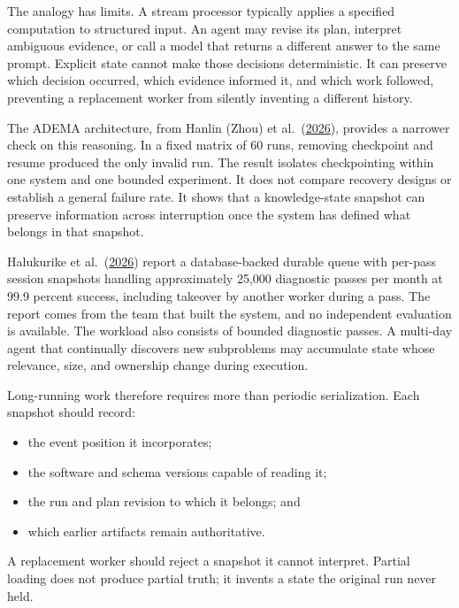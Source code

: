 The analogy has limits. A stream processor typically applies a specified computation to structured input. An agent may revise its plan, interpret ambiguous evidence, or call a model that returns a different answer to the same prompt. Explicit state cannot make those decisions deterministic. It can preserve which decision occurred, which evidence informed it, and which work followed, preventing a replacement worker from silently inventing a different history.

The ADEMA architecture, from Hanlin (Zhou) et al.~(\href{https://arxiv.org/abs/2604.25849}{2026}), provides a narrower check on this reasoning. In a fixed matrix of 60 runs, removing checkpoint and resume produced the only invalid run. The result isolates checkpointing within one system and one bounded experiment. It does not compare recovery designs or establish a general failure rate. It shows that a knowledge-state snapshot can preserve information across interruption once the system has defined what belongs in that snapshot.

Halukurike et al.~(\href{https://tech.instacart.com/blueberry-force-multiplier-for-the-on-call-engineer-98c446dfcc12}{2026}) report a database-backed durable queue with per-pass session snapshots handling approximately 25,000 diagnostic passes per month at 99.9 percent success, including takeover by another worker during a pass. The report comes from the team that built the system, and no independent evaluation is available. The workload also consists of bounded diagnostic passes. A multi-day agent that continually discovers new subproblems may accumulate state whose relevance, size, and ownership change during execution.


Long-running work therefore requires more than periodic serialization. Each snapshot should record:

\begin{itemize}
\tightlist
\item
  the event position it incorporates;
\item
  the software and schema versions capable of reading it;
\item
  the run and plan revision to which it belongs; and
\item
  which earlier artifacts remain authoritative.
\end{itemize}

A replacement worker should reject a snapshot it cannot interpret. Partial loading does not produce partial truth; it invents a state the original run never held.

